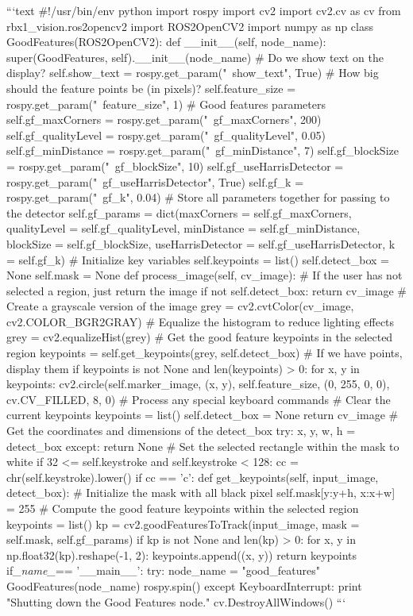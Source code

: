 ```text
#!/usr/bin/env python 
import rospy
import cv2
import cv2.cv as cv
from rbx1_vision.ros2opencv2 import ROS2OpenCV2
import numpy as np
class GoodFeatures(ROS2OpenCV2):
def __init__(self, node_name):
super(GoodFeatures, self).__init__(node_name)
# Do we show text on the display?
self.show_text = rospy.get_param("~show_text", True)
# How big should the feature points be (in pixels)?
self.feature_size = rospy.get_param("~feature_size", 1)
# Good features parameters
self.gf_maxCorners = rospy.get_param("~gf_maxCorners", 200)
self.gf_qualityLevel = rospy.get_param("~gf_qualityLevel", 0.05)
self.gf_minDistance = rospy.get_param("~gf_minDistance", 7)
self.gf_blockSize = rospy.get_param("~gf_blockSize", 10)
self.gf_useHarrisDetector =
rospy.get_param("~gf_useHarrisDetector", True)
self.gf_k = rospy.get_param("~gf_k", 0.04)
# Store all parameters together for passing to the detector
self.gf_params 
= dict(maxCorners = self.gf_maxCorners, qualityLevel = self.gf_qualityLevel, minDistance = self.gf_minDistance,
blockSize = self.gf_blockSize, useHarrisDetector = self.gf_useHarrisDetector, k = self.gf_k)
# Initialize key variables
self.keypoints = list()
self.detect_box = None
self.mask = None
def process_image(self, cv_image):
# If the user has not selected a region, just return the image
if not self.detect_box:
return cv_image
# Create a grayscale version of the image
grey = cv2.cvtColor(cv_image, cv2.COLOR_BGR2GRAY)
# Equalize the histogram to reduce lighting effects
grey = cv2.equalizeHist(grey)
# Get the good feature keypoints in the selected region
keypoints = self.get_keypoints(grey, self.detect_box)
# If we have points, display them
if keypoints is not None and len(keypoints) > 0:
for x, y in keypoints:
cv2.circle(self.marker_image, (x, y), self.feature_size,
(0, 255, 0, 0), cv.CV_FILLED, 8, 0) 
# Process any special keyboard commands
        # Clear the current keypoints
keypoints = list() self.detect_box = None
return cv_image
# Get the coordinates and dimensions of the detect_box
try:
x, y, w, h = detect_box
except:
    return None
# Set the selected rectangle within the mask to white
if 32 <= self.keystroke and self.keystroke < 128: cc = chr(self.keystroke).lower()
if cc == 'c':
def get_keypoints(self, input_image, detect_box): # Initialize the mask with all black pixel
self.mask[y:y+h, x:x+w] = 255 
# Compute the good feature keypoints within the selected region
keypoints = list()
kp = cv2.goodFeaturesToTrack(input_image, mask = self.mask,
\textbf{}self.gf_params)
if kp is not None and len(kp) > 0:
for x, y in np.float32(kp).reshape(-1, 2):
keypoints.append((x, y)) return keypoints
if\textit{_name_}== '__main__': try:
node_name = "good_features" GoodFeatures(node_name) rospy.spin()
except KeyboardInterrupt:
print "Shutting down the Good Features node." cv.DestroyAllWindows()
```

